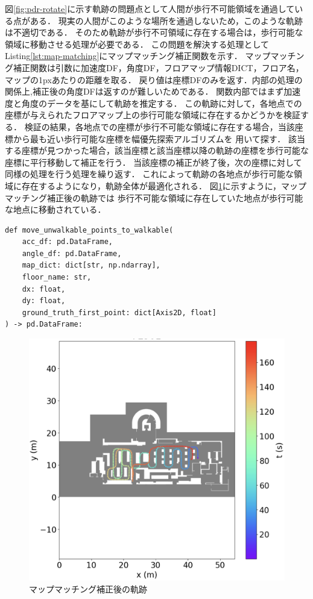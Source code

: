 
図\ref{fig:pdr-rotate}に示す軌跡の問題点として人間が歩行不可能領域を通過している点がある．
現実の人間がこのような場所を通過しないため，このような軌跡は不適切である．
そのため軌跡が歩行不可領域に存在する場合は，歩行可能な領域に移動させる処理が必要である．
この問題を解決する処理としてListing\ref{lst:map-matching}にマップマッチング補正関数を示す．
マップマッチング補正関数は引数に加速度DF，角度DF，フロアマップ情報DICT，フロア名，マップの1pxあたりの距離を取る．
戻り値は座標DFのみを返す．内部の処理の関係上,補正後の角度DFは返すのが難しいためである．
関数内部ではまず加速度と角度のデータを基にして軌跡を推定する．
この軌跡に対して，各地点での座標が与えられたフロアマップ上の歩行可能な領域に存在するかどうかを検証する．
検証の結果，各地点での座標が歩行不可能な領域に存在する場合，当該座標から最も近い歩行可能な座標を幅優先探索アルゴリズムを
用いて探す．
該当する座標が見つかった場合，該当座標と該当座標以降の軌跡の座標を歩行可能な座標に平行移動して補正を行う．
当該座標の補正が終了後，次の座標に対して同様の処理を行う処理を繰り返す．
これによって軌跡の各地点が歩行可能な領域に存在するようになり，軌跡全体が最適化される．
図\ref{fig:map-matching}に示すように，マップマッチング補正後の軌跡では
歩行不可能な領域に存在していた地点が歩行可能な地点に移動されている．

\begin{lstlisting}[caption={マップマッチング補正}, label=lst:map-matching]
def move_unwalkable_points_to_walkable(
    acc_df: pd.DataFrame,
    angle_df: pd.DataFrame,
    map_dict: dict[str, np.ndarray],
    floor_name: str,
    dx: float,
    dy: float,
    ground_truth_first_point: dict[Axis2D, float]
) -> pd.DataFrame:

\end{lstlisting}

\begin{figure}[h]
	\centering
	\includegraphics[width=\linewidth]{image/map-matching.jpg}
	\caption{マップマッチング補正後の軌跡}    \label{fig:map-matching}
\end{figure}
